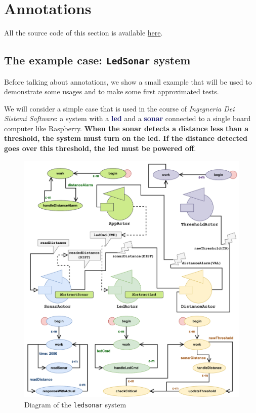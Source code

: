 \section{Annotations}

All the source code of this section is available \href{https://github.com/LM-96/QA-Extensions/tree/main/it.unibo.qakactor/src/main/kotlin/annotations}{here}.

\subsection{The example case: \texttt{LedSonar} system}

Before talking about annotations, we show a small example that will be used to demonstrate some usages and to make some first approximated tests.

We will consider a simple case that is used in the course of \emph{Ingegneria Dei Sistemi Software}: a system with a \textcolor{MidnightBlue}{\textbf{led}} and a \textcolor{MidnightBlue}{\textbf{sonar}} connected to a single board computer like Raspberry.
\textbf{When the sonar detects a distance less than a threshold, the system must turn on the led. If the distance detected goes over this threshold, the led must be powered off}.

\begin{figure}[h!]
	\centering
	\includegraphics[width=\textwidth]{img/[EG]led_sonar_actor_diagram}
	\caption{Diagram of the \texttt{ledsonar} system}
	\label{fig::ledsonar_system}
\end{figure}

